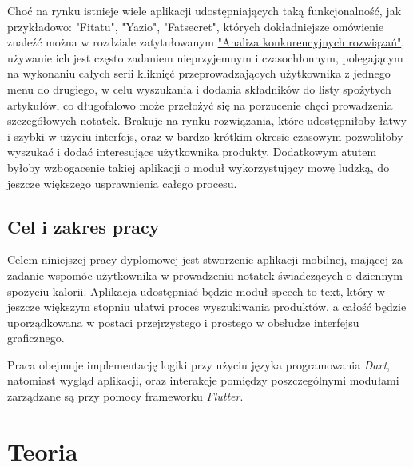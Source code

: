 \documentclass[12pt, a4paper]{article}
\begin{document}
\begin{sloppypar}
{{    Choć na rynku istnieje wiele aplikacji udostępniających taką funkcjonalność, jak
    przykładowo: "Fitatu", "Yazio", "Fatsecret", których dokładniejsze omówienie znaleźć
    można w rozdziale zatytułowanym 
    \hyperref[sec:analysis]{"Analiza konkurencyjnych rozwiązań"},
    używanie ich jest często zadaniem nieprzyjemnym i czasochłonnym, polegającym
    na wykonaniu całych serii kliknięć przeprowadzających użytkownika z jednego menu
    do drugiego, w celu wyszukania i dodania składników do listy spożytych artykułów,
    co długofalowo może przełożyć się na porzucenie chęci prowadzenia szczegółowych
    notatek. Brakuje na rynku rozwiązania, które udostępniłoby łatwy i szybki
    w użyciu interfejs, oraz w bardzo krótkim okresie czasowym pozwoliłoby wyszukać 
    i dodać interesujące użytkownika produkty. Dodatkowym atutem byłoby wzbogacenie
    takiej aplikacji o moduł wykorzystujący mowę ludzką, do jeszcze większego 
    usprawnienia całego procesu.
  }
  \subsection{Cel i zakres pracy}
  {
    Celem niniejszej pracy dyplomowej jest stworzenie aplikacji mobilnej, mającej 
    za zadanie wspomóc użytkownika w prowadzeniu notatek świadczących o dziennym
    spożyciu kalorii. Aplikacja udostępniać będzie moduł speech to text,
    który w jeszcze większym stopniu ułatwi proces wyszukiwania produktów, a całość
    będzie uporządkowana w postaci przejrzystego i prostego w obsłudze interfejsu
    graficznego.

    Praca obejmuje implementację logiki przy użyciu języka programowania \emph{Dart},
    natomiast wygląd aplikacji, oraz interakcje pomiędzy poszczególnymi modułami
    zarządzane są przy pomocy frameworku \emph{Flutter}.
  }

}

\section{Teoria}
{
}
\end{sloppypar}
\end{document}
